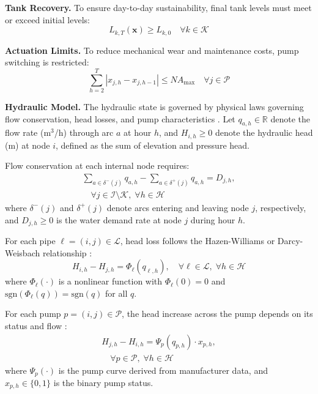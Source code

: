 \documentclass[a4paper,fleqn]{cas-dc}
\begin{document}
\textbf{Tank Recovery.} To ensure day-to-day sustainability, final tank levels must meet or exceed initial levels:
\begin{equation}
	L_{k,T}(\mathbf{x}) \ge L_{k,0} \quad \forall k \in \mathcal{K}
	\label{eq:tank_recovery}
\end{equation}

\textbf{Actuation Limits.} To reduce mechanical wear and maintenance costs, pump switching is restricted:
\begin{equation}
	\sum_{h=2}^{T} |x_{j,h} - x_{j,h-1}| \le NA_{\max} \quad \forall j \in \mathcal{P}
	\label{eq:actuation_limits}
\end{equation}

\textbf{Hydraulic Model.} The hydraulic state is governed by physical laws governing flow conservation, head losses, and pump characteristics \cite{Bonvin2021}. Let $q_{a,h} \in \mathbb{R}$ denote the flow rate (m$^3$/h) through arc $a$ at hour $h$, and $H_{i,h} \geq 0$ denote the hydraulic head (m) at node $i$, defined as the sum of elevation and pressure head.

Flow conservation at each internal node requires:
\begin{multline}
	\sum_{a \in \delta^-(j)} q_{a,h} - \sum_{a \in \delta^+(j)} q_{a,h} = D_{j,h}, \\
	\quad \forall j \in \mathcal{I} \setminus \mathcal{K}, \; \forall h \in \mathcal{H}
	\label{eq:flow_conservation}
\end{multline}
where $\delta^-(j)$ and $\delta^+(j)$ denote arcs entering and leaving node $j$, respectively, and $D_{j,h} \geq 0$ is the water demand rate at node $j$ during hour $h$.

For each pipe $\ell = (i,j) \in \mathcal{L}$, head loss follows the Hazen-Williams or Darcy-Weisbach relationship \cite{Brown2002,Burgschweiger2009a}:
\begin{equation}
	H_{i,h} - H_{j,h} = \Phi_\ell(q_{\ell,h}), \quad \forall \ell \in \mathcal{L}, \; \forall h \in \mathcal{H}
	\label{eq:pipe_head_loss}
\end{equation}
where $\Phi_\ell(\cdot)$ is a nonlinear function with $\Phi_\ell(0) = 0$ and $\text{sgn}(\Phi_\ell(q)) = \text{sgn}(q)$ for all $q$.

For each pump $p = (i,j) \in \mathcal{P}$, the head increase across the pump depends on its status and flow \cite{Burgschweiger2009b,Morsi2012}:
\begin{multline}
	H_{j,h} - H_{i,h} = \Psi_p(q_{p,h}) \cdot x_{p,h}, \\
	\quad \forall p \in \mathcal{P}, \; \forall h \in \mathcal{H}
	\label{eq:pump_head}
\end{multline}
where $\Psi_p(\cdot)$ is the pump curve derived from manufacturer data, and $x_{p,h} \in \{0,1\}$ is the binary pump status.
\end{document}
